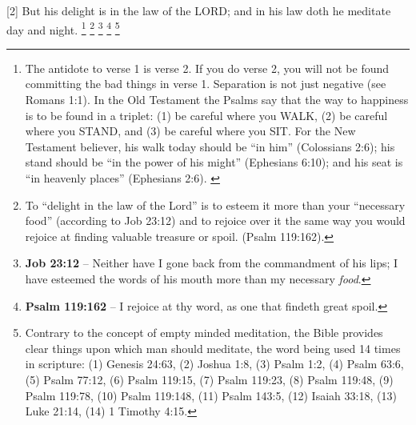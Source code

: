 [2] \textcolor[rgb]{0.00,0.00,1.00}{But his delight is in the law of the LORD; and in his law doth he meditate day and night.} \footnote{The antidote to verse 1 is verse 2. If you do verse 2, you will not be found committing the bad things in verse 1. Separation is not just negative (see Romans 1:1). In the Old Testament the Psalms say that the way to happiness is to be found in a triplet: (1) be careful where you WALK, (2) be careful where you STAND, and (3) be careful where you SIT.  For the New Testament believer, his walk today should be ``in him'' (Colossians 2:6); his stand should be ``in the power of his might'' (Ephesians 6:10); and his seat is ``in heavenly places'' (Ephesians 2:6). \cite{Ruckman1992Psalms}} \footnote{To ``delight in the law of the Lord'' is to esteem it more than your ``necessary food'' (according to Job 23:12) and to rejoice over it the same way you would rejoice at finding valuable treasure or spoil. (Psalm 119:162).\cite{Ruckman1992Psalms}} \footnote{\textbf{Job 23:12} -- Neither have I gone back from the commandment of his lips; I have esteemed the words of his mouth more than my necessary \emph{food}.} \footnote{\textbf{Psalm 119:162} -- I rejoice at thy word, as one that findeth great spoil.} \footnote{Contrary to the concept of empty minded meditation, the Bible provides clear things upon which man should meditate, the word being used 14 times in scripture: (1) Genesis 24:63, (2) Joshua 1:8, (3) Psalm 1:2, (4) Psalm 63:6, (5) Psalm 77:12, (6) Psalm 119:15, (7) Psalm 119:23, (8) Psalm 119:48, (9) Psalm 119:78, (10) Psalm 119:148, (11) Psalm 143:5, (12) Isaiah 33:18, (13) Luke 21:14, (14) 1 Timothy 4:15.}

